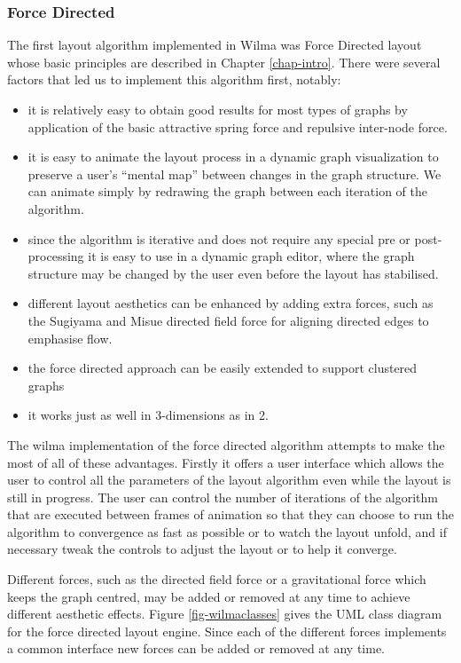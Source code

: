 \documentclass[runningheads]{cl2emult}
\begin{document}
\subsubsection{Force Directed} \label{sec:forcedirectedlayout}
The first layout algorithm implemented in Wilma was Force Directed
layout whose basic principles are described in Chapter
\ref{chap-intro}.  There were several factors that led us to
implement this algorithm first, notably:
\begin{itemize}
\item it is relatively easy to obtain good results for most types of
graphs by application of the basic attractive spring force and
repulsive inter-node force.
\item it is easy to animate the layout process in a dynamic
graph visualization to preserve a user's ``mental map''\cite{Misue:VLC95}
between changes in the graph structure.  We can animate simply by
redrawing the graph between each iteration of the algorithm.
\item since the algorithm is iterative and does not require any
special pre or post-processing it is easy to use in a dynamic graph
editor, where the graph structure may be changed by the user even
before the layout has stabilised.
\item different layout
aesthetics can be enhanced by adding extra forces, such as the Sugiyama and Misue\cite{Sugiyama:VLC95}
directed field force for aligning directed edges to emphasise flow.
\item the force directed approach can be easily extended to support
clustered graphs \cite{Huang:GD98}
\item it works just as well in 3-dimensions as in 2.
\end{itemize}
The wilma implementation of the force directed algorithm attempts to make the most
of all of these advantages.  Firstly it offers a user interface which
allows the user to control all the parameters of the layout algorithm
even while the layout is still in progress.  The user can control the
number of iterations of the algorithm that are executed between frames
of animation so that they can choose to run the algorithm to
convergence as fast as possible or to watch the layout unfold, and if
necessary tweak the controls to adjust the layout or to help it
converge.

Different forces, such as the directed field force or
a gravitational force which keeps the graph centred, may be added or removed
at any time to achieve different aesthetic effects.  Figure
\ref{fig-wilmaclasses} gives the UML class diagram for the force
directed layout engine.  Since each of the different forces implements
a common interface new forces can be added or removed at any time.
\end{document}
